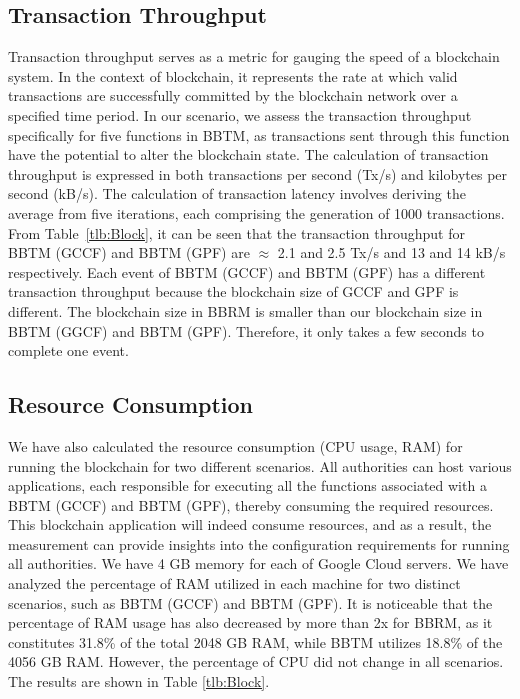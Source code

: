 \subsection{Transaction Throughput}
Transaction throughput serves as a metric for gauging the speed of a blockchain system. In the context of blockchain, it represents the rate at which valid transactions are successfully committed by the blockchain network over a specified time period. In our scenario, we assess the transaction throughput specifically for five functions in BBTM, as transactions sent through this function have the potential to alter the blockchain state. The calculation of transaction throughput is expressed in both transactions per second (Tx/s) and kilobytes per second (kB/s). The calculation of transaction latency involves deriving the average from five iterations, each comprising the generation of 1000 transactions. From Table~\ref{tlb:Block}, it can be seen that the transaction throughput for BBTM (GCCF) and BBTM (GPF) are  $\approx$ 2.1 and 2.5 Tx/s and 13 and 14 kB/s respectively. Each event of BBTM (GCCF) and BBTM (GPF) has a different transaction throughput because the blockchain size of GCCF and GPF is different. The blockchain size in BBRM is smaller than our blockchain size in BBTM (GGCF) and BBTM (GPF). Therefore, it only takes a few seconds to complete one event.      

\subsection{Resource Consumption}
We have also calculated the resource consumption (CPU usage, RAM) for running the blockchain for two different scenarios. All authorities can host various applications, each responsible for executing all the functions associated with a BBTM (GCCF) and BBTM (GPF), thereby consuming the required resources.  This blockchain application will indeed consume resources, and as a result, the measurement can provide insights into the configuration requirements for running all authorities. We have 4 GB memory for each of Google Cloud servers. We have analyzed the percentage of RAM utilized in each machine for two distinct scenarios, such as BBTM (GCCF) and BBTM (GPF). It is noticeable that the percentage of RAM usage has also decreased by more than 2x for BBRM, as it constitutes 31.8\% of the total 2048 GB RAM, while BBTM utilizes 18.8\% of the 4056 GB RAM. However, the percentage of CPU did not change in all scenarios. The results are shown in Table \ref{tlb:Block}.

